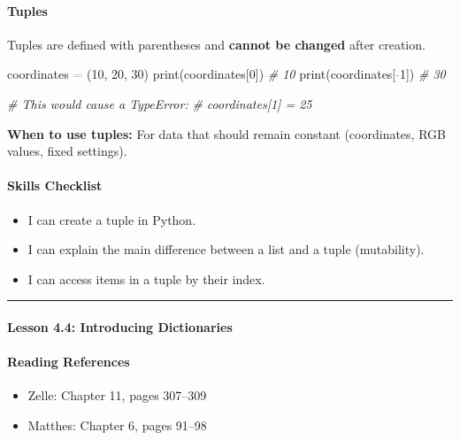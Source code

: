 \documentclass[
  justified,
  openright,
]{tufte-book}
\let\subsection\paragraph
\let\paragraph\paragraph
\newcommand{\CommentTok}[1]{\textcolor{CodeComment}{\textit{#1}}}  %
\newcommand{\CodeNumTok}[1]{\textcolor{CodeNumber}{#1}}             %
\newcommand{\OperatorTok}[1]{\textcolor{DarkGray}{#1}}              %
\newenvironment{Shaded}{%
  \begin{mdframed}[style=TufteCode]%
}{%
  \end{mdframed}%
}
\let\subsection\paragraph
\let\paragraph\paragraph
\providecommand{\tightlist}{%
  \setlength{\itemsep}{0pt}\setlength{\parskip}{0pt}}
\begin{document}
\subsection{Tuples}\label{tuples}

Tuples are defined with parentheses and \textbf{cannot be changed} after
creation.

\begin{Shaded}
\begin{Highlighting}[]
coordinates \OperatorTok{=} (\CodeNumTok{10}, \CodeNumTok{20}, \CodeNumTok{30})
print(coordinates[\CodeNumTok{0}])     \CommentTok{\# 10}
print(coordinates[\OperatorTok{{-}}\CodeNumTok{1}])    \CommentTok{\# 30}
 
\CommentTok{\# This would cause a TypeError:}
\CommentTok{\# coordinates[1] = 25}
\end{Highlighting}
\end{Shaded}

\textbf{When to use tuples:} For data that should remain constant
(coordinates, RGB values, fixed settings).

\subsection{Skills Checklist}\label{skills-checklist-19}

\begin{itemize}
\tightlist
\item[$\square$]
  I can create a tuple in Python.
\item[$\square$]
  I can explain the main difference between a list and a tuple
  (mutability).
\item[$\square$]
  I can access items in a tuple by their index.
\end{itemize}

\begin{center}\rule{0.5\linewidth}{0.5pt}\end{center}

\subsection{Lesson 4.4: Introducing
Dictionaries}\label{lesson-4.4-introducing-dictionaries}

\subsection{Reading References}\label{reading-references-17}

\begin{itemize}
\tightlist
\item
  Zelle: Chapter 11, pages 307--309
\item
  Matthes: Chapter 6, pages 91--98
\end{itemize}
\end{document}
